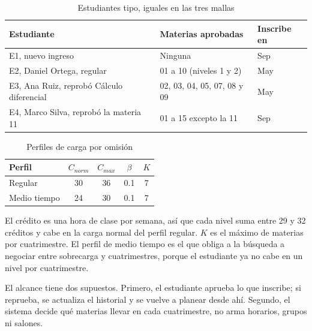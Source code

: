 \begin{table}[H]
  \begin{center}
    \caption{Estudiantes tipo, iguales en las tres mallas}
    \label{TAB::Alumnos}
    \begin{tabular}{|| p{5.2cm} | p{5.2cm} | l ||}
        \hline
        Estudiante & Materias aprobadas & Inscribe en \\ [0.5ex]
        \hline\hline
        E1, nuevo ingreso & Ninguna & Sep \\
        \hline
        E2, Daniel Ortega, regular & 01 a 10 (niveles 1 y 2) & May \\
        \hline
        E3, Ana Ruiz, reprobó Cálculo diferencial & 02, 03, 04, 05, 07, 08 y 09 & May \\
        \hline
        E4, Marco Silva, reprobó la materia 11 & 01 a 15 excepto la 11 & Sep \\
        \hline
    \end{tabular}
  \end{center}
\end{table}

\begin{table}[H]
  \begin{center}
    \caption{Perfiles de carga por omisión}
    \label{TAB::Perfiles}
    \begin{tabular}{|| l | c | c | c | c ||}
        \hline
        Perfil & $C_{norm}$ & $C_{max}$ & $\beta$ & $K$ \\ [0.5ex]
        \hline\hline
        Regular & 30 & 36 & 0.1 & 7 \\
        \hline
        Medio tiempo & 24 & 30 & 0.1 & 7 \\
        \hline
    \end{tabular}
  \end{center}
\end{table}

El crédito es una hora de clase por semana, así que cada nivel suma entre 29 y 32 créditos y cabe en la carga normal del perfil regular. $K$ es el máximo de materias por cuatrimestre. El perfil de medio tiempo es el que obliga a la búsqueda a negociar entre sobrecarga y cuatrimestres, porque el estudiante ya no cabe en un nivel por cuatrimestre.

El alcance tiene dos supuestos. Primero, el estudiante aprueba lo que inscribe; si reprueba, se actualiza el historial y se vuelve a planear desde ahí. Segundo, el sistema decide qué materias llevar en cada cuatrimestre, no arma horarios, grupos ni salones.

